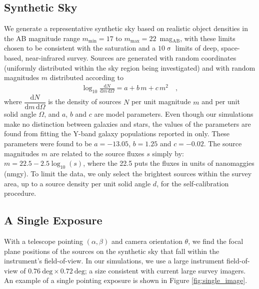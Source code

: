 \documentclass[preprint,pdftex]{aastex}
\newcommand{\dd}{\text{d}}
\begin{document}
\subsection{Synthetic Sky}
We generate a representative synthetic sky based on realistic object densities in the AB magnitude range $m_\text{min} = 17$ to $m_\text{max} = 22$~mag$_\text{AB}$, with these limits chosen to be consistent with the saturation and a $10\upsigma{}$ limits of deep, space-based, near-infrared survey. Sources are generated with random coordinates (uniformly distributed within the sky region being investigated) and with random magnitudes $m$ distributed according to
\begin{eqnarray}
\log_{10} \frac{\dd N}{\dd m \, \dd \Omega} = a + b\,m + c\,m^2 \label{eqn:power_law} \quad , 
\end{eqnarray}
where $\dfrac{\dd N}{\dd m \, \dd  \Omega}$  is the density of sources $N$ per unit magnitude $m$ and per unit solid angle $\Omega$, and $a$, $b$ and $c$ are model parameters. Even though our simulations make no distinction between galaxies and stars, the values of the parameters are found from fitting the Y-band galaxy populations reported in \citet{win11} only. These parameters were found to be $a = -13.05$, $b = 1.25$ and $c = -0.02$. The source magnitudes $m$ are related to the source fluxes $s$ simply by: $m = 22.5 - 2.5\log_{10}(s)$, where the 22.5 puts the fluxes in units of nanomaggies (nmgy). To limit the data, we only select the brightest sources within the survey area, up to a source density per unit solid angle $d$, for the self-calibration procedure.

\subsection{A Single Exposure}
\label{sec:single_exposure}
With a telescope pointing $(\alpha, \beta)$ and camera orientation $\theta$, we find the focal plane positions of the sources on the synthetic sky that fall within the instrument's field-of-view. In our simulations, we use a large instrument field-of-view of $0.76~ \text{deg} \times 0.72~\text{deg}$; a size consistent with current large survey imagers. An example of a single pointing exposure is shown in Figure \ref{fig:single_image}.
\end{document}
